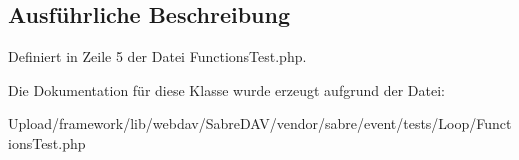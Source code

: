 \subsection{Ausführliche Beschreibung}


Definiert in Zeile 5 der Datei Functions\+Test.\+php.



Die Dokumentation für diese Klasse wurde erzeugt aufgrund der Datei\+:\begin{DoxyCompactItemize}
\item 
Upload/framework/lib/webdav/\+Sabre\+D\+A\+V/vendor/sabre/event/tests/\+Loop/Functions\+Test.\+php\end{DoxyCompactItemize}
